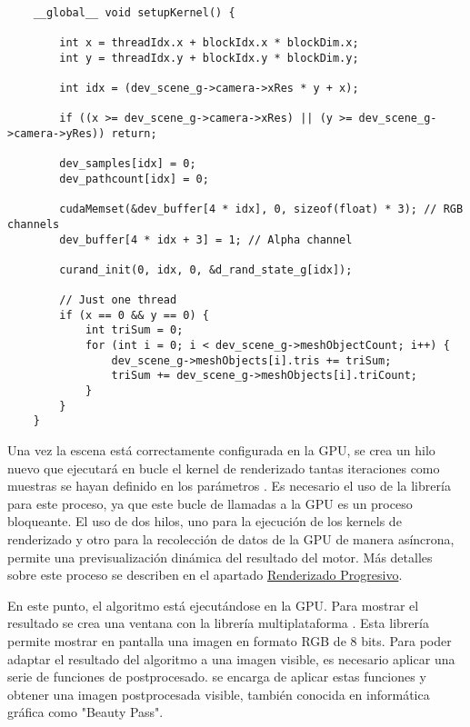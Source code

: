 \begin{minipage}[c]{0.95\textwidth}
\begin{lstlisting}[label={cod:setupkernel}, caption={Kernel de configuración inicial}]
	
	__global__ void setupKernel() {

		int x = threadIdx.x + blockIdx.x * blockDim.x;
		int y = threadIdx.y + blockIdx.y * blockDim.y;

		int idx = (dev_scene_g->camera->xRes * y + x);

		if ((x >= dev_scene_g->camera->xRes) || (y >= dev_scene_g->camera->yRes)) return;

		dev_samples[idx] = 0;
		dev_pathcount[idx] = 0;

		cudaMemset(&dev_buffer[4 * idx], 0, sizeof(float) * 3); // RGB channels
		dev_buffer[4 * idx + 3] = 1; // Alpha channel

		curand_init(0, idx, 0, &d_rand_state_g[idx]);

		// Just one thread
		if (x == 0 && y == 0) {
			int triSum = 0;
			for (int i = 0; i < dev_scene_g->meshObjectCount; i++) {
				dev_scene_g->meshObjects[i].tris += triSum;
				triSum += dev_scene_g->meshObjects[i].triCount;
			}
		}
	}
\end{lstlisting}
\end{minipage}

Una vez la escena está correctamente configurada en la GPU, se crea un hilo nuevo que ejecutará en bucle el kernel de renderizado tantas iteraciones como muestras se hayan definido en los parámetros . Es necesario el uso de la librería  para este proceso, ya que este bucle de llamadas a la GPU es un proceso bloqueante. El uso de dos hilos, uno para la ejecución de los kernels de renderizado y otro para la recolección de datos de la GPU de manera asíncrona, permite una previsualización dinámica del resultado del motor. Más detalles sobre este proceso se describen en el apartado \hyperref[progressiverender]{Renderizado Progresivo}.

En este punto, el algoritmo está ejecutándose en la GPU. Para mostrar el resultado se crea una ventana con la librería multiplataforma . Esta librería permite mostrar en pantalla una imagen en formato RGB de 8 bits. Para poder adaptar el resultado del algoritmo a una imagen visible, es necesario aplicar una serie de funciones de postprocesado.  se encarga de aplicar estas funciones y obtener una imagen postprocesada visible, también conocida en informática gráfica como "Beauty Pass".

